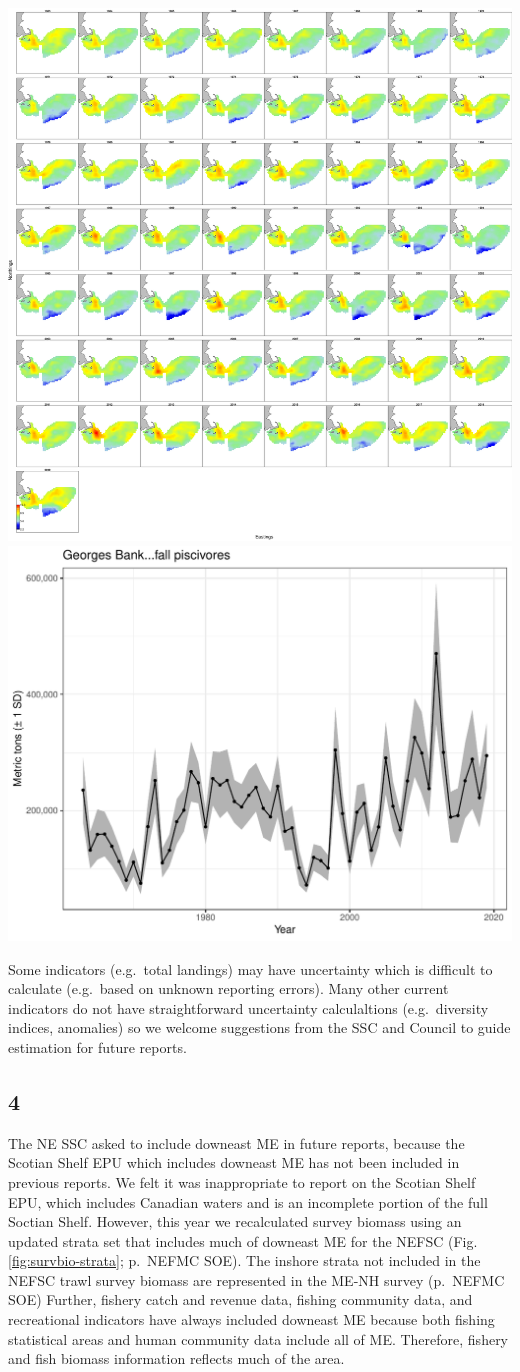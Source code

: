 \documentclass[
  10pt,
]{article}
\let\origfigure\figure
\let\endorigfigure\endfigure
\renewenvironment{figure}[1][2] {
    \expandafter\origfigure\expandafter[H]
} {
    \endorigfigure
}
\begin{document}
\begin{figure}

{\centering \includegraphics[width=0.49\linewidth]{images/ln_density} \includegraphics[width=0.49\linewidth]{images/biomass_plot} 

}

\caption{Georges Bank piscivoves biomass and uncertainty as estimated by the VAST model.}\label{fig:VASTtest}
\end{figure}

Some indicators (e.g.~total landings) may have uncertainty which is
difficult to calculate (e.g.~based on unknown reporting errors). Many
other current indicators do not have straightforward uncertainty
calculaltions (e.g.~diversity indices, anomalies) so we welcome
suggestions from the SSC and Council to guide estimation for future
reports.

\hypertarget{section-3}{%
\subsection{4}\label{section-3}}

The NE SSC asked to include downeast ME in future reports, because the
Scotian Shelf EPU which includes downeast ME has not been included in
previous reports. We felt it was inappropriate to report on the Scotian
Shelf EPU, which includes Canadian waters and is an incomplete portion
of the full Soctian Shelf. However, this year we recalculated survey
biomass using an updated strata set that includes much of downeast ME
for the NEFSC (Fig. \ref{fig:survbio-strata}; p.~NEFMC SOE). The inshore
strata not included in the NEFSC trawl survey biomass are represented in
the ME-NH survey (p.~NEFMC SOE) Further, fishery catch and revenue data,
fishing community data, and recreational indicators have always included
downeast ME because both fishing statistical areas and human community
data include all of ME. Therefore, fishery and fish biomass information
reflects much of the area.
\end{document}
